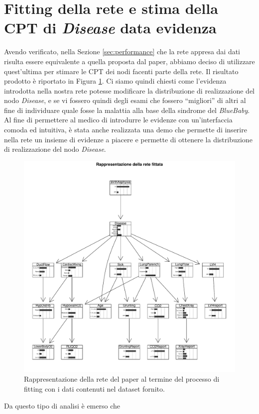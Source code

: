\section{Fitting della rete e stima della CPT di \textit{Disease} data evidenza}
Avendo verificato, nella Sezione \ref{sec:performance} che la rete appresa dai dati risulta essere equivalente a quella proposta dal paper, abbiamo deciso di utilizzare quest'ultima per stimare le CPT dei nodi facenti parte della rete. Il risultato prodotto è riportato in Figura \ref{fig:paperfitted}. Ci siamo quindi chiesti come l'evidenza introdotta nella nostra rete potesse modificare la distribuzione di realizzazione del nodo \textit{Disease}, e se vi fossero quindi degli esami che fossero “migliori” di altri al fine di individuare quale fosse la malattia alla base della sindrome del \textit{BlueBaby}. Al fine di permettere al medico di introdurre le evidenze con un'interfaccia comoda ed intuitiva, è stata anche realizzata una demo che permette di inserire nella rete un insieme di evidenze a piacere e permette di ottenere la distribuzione di realizzazione del nodo \textit{Disease}.
\begin{figure}
	\centering
	\includegraphics[width=1\linewidth]{images/paper_fitted}
	\caption{Rappresentazione della rete del paper al termine del processo di fitting con i dati contenuti nel dataset fornito.}
	\label{fig:paperfitted}
\end{figure}
Da questo tipo di analisi è emerso che